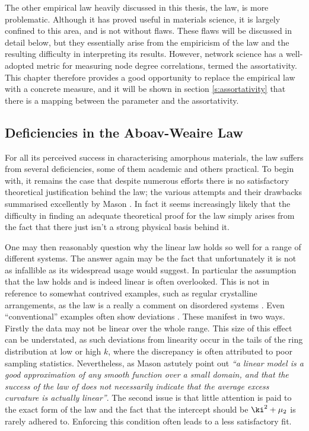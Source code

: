The other empirical law heavily discussed in this thesis, the \aw{} law, is more problematic.
Although it has proved useful in materials science, it is largely confined to this area, and is not without flaws.
These flaws will be discussed in detail below, but they essentially arise from the empiricism of the law and the resulting difficulty in interpreting its results.
However, network science has a well\--adopted metric for measuring node degree correlations, termed the assortativity.  
This chapter therefore provides a good opportunity to replace the empirical \aw{} law with a concrete measure, and it will be shown in section \ref{s:assortativity} that there is a mapping between the \aw{} parameter and the assortativity.

\subsection{Deficiencies in the Aboav\--Weaire Law}
\label{s:awdeficiencies}

For all its perceived success in characterising amorphous materials, the \aw{} law suffers from several deficiencies, some of them academic and others practical.
To begin with, it remains the case that despite numerous efforts \cite{Lambert1981,Kumar1994,Blanc1979,Rivier1985,Peshkin1991,Chiu1994} there is no satisfactory theoretical justification behind the \aw{} law; the various attempts and their drawbacks summarised excellently by Mason \etal{} \cite{Mason2012}.
In fact it seems increasingly likely that the difficulty in finding an adequate theoretical proof for the \aw{} law simply arises from the fact that there just isn't a strong physical basis behind it.

One may then reasonably question why the linear \aw{} law holds so well for a range of different systems.
The answer again may be the fact that unfortunately it is not as infallible as its widespread usage would suggest.
In particular the assumption that the law holds and is indeed linear is often overlooked.
This is not in reference to somewhat contrived examples, such as regular crystalline arrangements, as the \aw{} law is a really a comment on disordered systems \cite{Boots1984}.
Even ``conventional'' examples often show deviations \cite{Earnshaw1994,Kumar1994,Hilhorst2006}.
These manifest in two ways.
Firstly the data may not be linear over the whole range.
This size of this effect can be understated, as such deviations from linearity occur in the tails of the ring distribution at low or high $k$, where the discrepancy is often attributed to poor sampling statistics.
Nevertheless, as Mason \etal{} astutely point out \textit{``a linear model is a good approximation of any smooth function over a small domain, and that the success of the law of \aw{} does not necessarily indicate that the average excess curvature is actually linear''}.
The second issue is that little attention is paid to the exact form of the law and the fact that the intercept should be $\ki^2+\mu_2$ is rarely adhered to.
Enforcing this condition often leads to a less satisfactory fit. 

